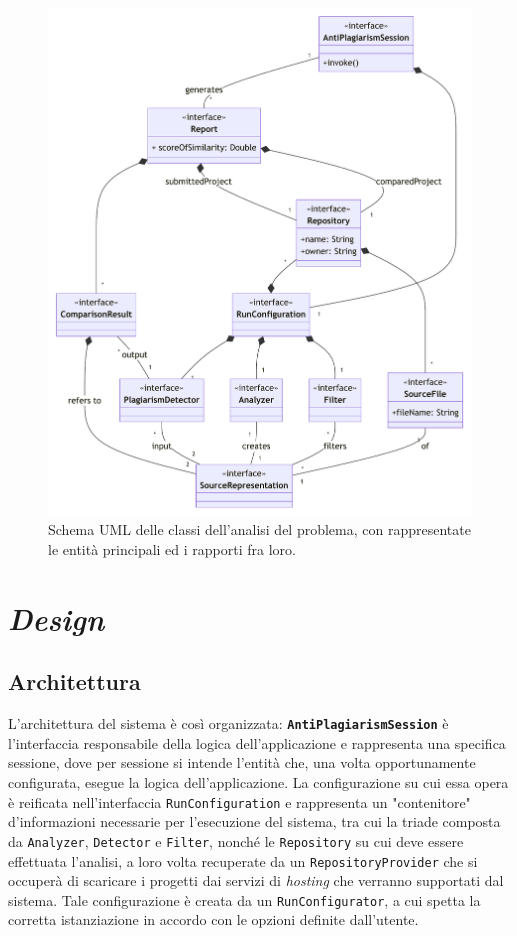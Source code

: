 \begin{figure}[h!]
    \centering
    \includegraphics[width=\textwidth]{resources/img/02-domain.pdf}
    \caption{Schema UML delle classi dell'analisi del problema, con rappresentate le entità principali ed i rapporti fra loro.}
    \label{img:02-domain}
\end{figure}

\section{\textit{Design}}

\subsection{Architettura}
\label{02-architecture}
L'architettura del sistema è così organizzata: \textbf{\texttt{AntiPlagiarismSession}} è l'interfaccia responsabile della logica dell'applicazione e rappresenta una specifica sessione, dove per sessione si intende l'entità che, una volta opportunamente configurata, esegue la logica dell'applicazione.
%
La configurazione su cui essa opera è reificata nell'interfaccia \texttt{RunConfiguration} e rappresenta un "contenitore" d'informazioni necessarie per l'esecuzione del sistema, tra cui la triade composta da \texttt{Analyzer}, \texttt{Detector} e \texttt{Filter}, nonché le \texttt{Repository} su cui deve essere effettuata l'analisi, a loro volta recuperate da un \texttt{RepositoryProvider} che si occuperà di scaricare i progetti dai servizi di \textit{hosting} che verranno supportati dal sistema.
%
Tale configurazione è creata da un \texttt{RunConfigurator}, a cui spetta la corretta istanziazione in accordo con le opzioni definite dall'utente.

